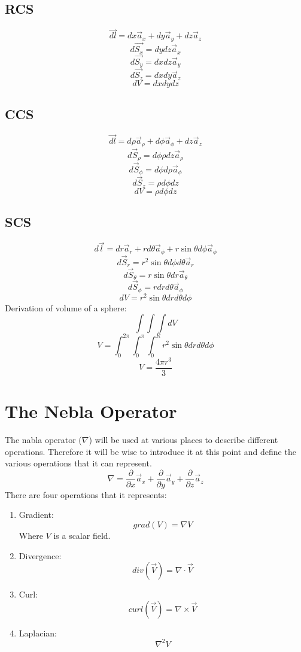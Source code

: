         \subsection{RCS}
            
            $$\vec{dl} = dx\vec{a}_x + dy\vec{a}_y + dz\vec{a}_z$$
            $$d\vec{S_x} = dydz\vec{a}_x$$
            $$d\vec{S_y} = dxdz\vec{a}_y$$
            $$d\vec{S_z} = dxdy\vec{a}_z$$
            $$dV = dxdydz$$
        \subsection{CCS}
            
            $$\vec{dl} = d\rho\vec{a}_\rho + d\phi\vec{a}_\phi + dz\vec{a}_z$$
            $$d\vec{S}_\rho = d\phi\rho dz\vec{a}_\rho$$
            $$d\vec{S}_\phi = d\phi d\rho\vec{a}_\phi$$
            $$d\vec{S}_z = \rho d\phi dz$$
            $$dV = \rho d\phi dz$$
        \subsection{SCS}
            
            $$d\vec{l}=dr\vec{a}_r + rd\theta\vec{a}_\phi + r\sin\theta d\phi\vec{a}_\phi$$
            $$d\vec{S}_r = r^2\sin\theta d\phi d\theta \vec{a}_r$$
            $$d\vec{S}_\theta = r\sin\theta dr\vec{a}_\theta$$
            $$d\vec{S}_\phi = rdrd\theta\vec{a}_\phi$$
            $$dV = r^2\sin\theta drd\theta d\phi$$
            Derivation of volume of a sphere:
            $$\int\int\int dV$$
            $$V = \int_{0}^{2\pi}\int_{0}^{\pi}\int_{0}^{R}r^2\sin\theta drd\theta d\phi$$
            $$V = \frac{4\pi{r}^3}{3}$$
    \section{The Nebla Operator}
        The nabla operator ($\nabla$) will be used at various places to describe different operations. Therefore it will be wise to introduce it at this point and define the various operations that it can represent.
        $$\nabla = \frac{\partial}{\partial x}\vec{a}_x + \frac{\partial}{\partial y}\vec{a}_y + \frac{\partial}{\partial z}\vec{a}_z$$
        There are four operations that it represents:
        \begin{enumerate}
            \item Gradient: $$grad(V) = \nabla V$$ Where $V$ is a scalar field.
            \item Divergence: $$div(\vec{V}) = \nabla \cdot \vec{V}$$
            \item Curl: $$curl(\vec{V}) = \nabla \times \vec{V}$$
            \item Laplacian: $$\nabla^2V$$
        \end{enumerate}
